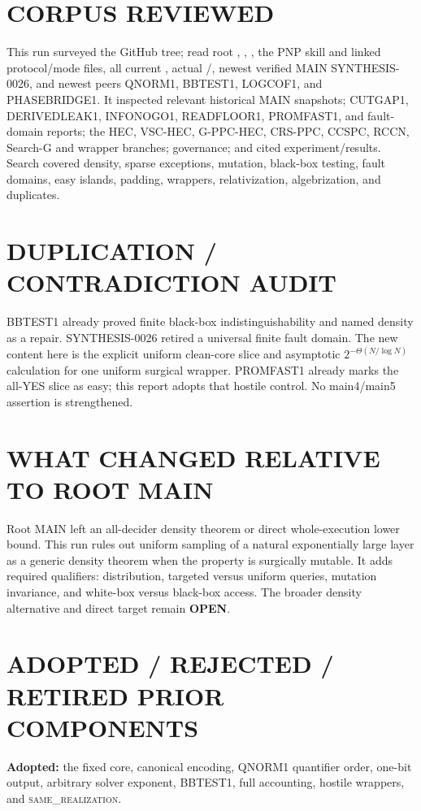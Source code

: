 \documentclass[11pt]{article}
\newcommand{\OPEN}{\textbf{OPEN}}
\newcommand{\same}{\textsc{same\_realization}}
\begin{document}
\section{CORPUS REVIEWED}
This run surveyed the GitHub tree; read root ,
, , the PNP skill and linked protocol/mode
files, all current , actual /,
newest verified MAIN SYNTHESIS-0026, and newest peers QNORM1, BBTEST1,
LOGCOF1, and PHASEBRIDGE1. It inspected relevant historical MAIN snapshots;
CUTGAP1, DERIVEDLEAK1, INFONOGO1, READFLOOR1, PROMFAST1, and fault-domain
reports; the HEC, VSC-HEC, G-PPC-HEC, CRS-PPC, CCSPC, RCCN, Search-G and
wrapper branches; governance; and cited experiment/results. Search covered
density, sparse exceptions, mutation, black-box testing, fault domains, easy
islands, padding, wrappers, relativization, algebrization, and duplicates.

\section{DUPLICATION / CONTRADICTION AUDIT}
BBTEST1 already proved finite black-box indistinguishability and named density
as a repair. SYNTHESIS-0026 retired a universal finite fault domain. The new
content here is the explicit uniform clean-core slice and asymptotic
\(2^{-\Theta(N/\log N)}\) calculation for one uniform surgical wrapper.
PROMFAST1 already marks the all-YES slice as easy; this report adopts that
hostile control. No main4/main5 assertion is strengthened.

\section{WHAT CHANGED RELATIVE TO ROOT MAIN}
Root MAIN left an all-decider density theorem or direct whole-execution lower
bound. This run rules out uniform sampling of a natural exponentially large
layer as a generic density theorem when the property is surgically mutable.
It adds required qualifiers: distribution, targeted versus uniform queries,
mutation invariance, and white-box versus black-box access. The broader
density alternative and direct target remain \OPEN.

\section{ADOPTED / REJECTED / RETIRED PRIOR COMPONENTS}
\textbf{Adopted:} the fixed core, canonical encoding, QNORM1 quantifier order,
one-bit output, arbitrary solver exponent, BBTEST1, full accounting, hostile
wrappers, and \same{}.
\end{document}
